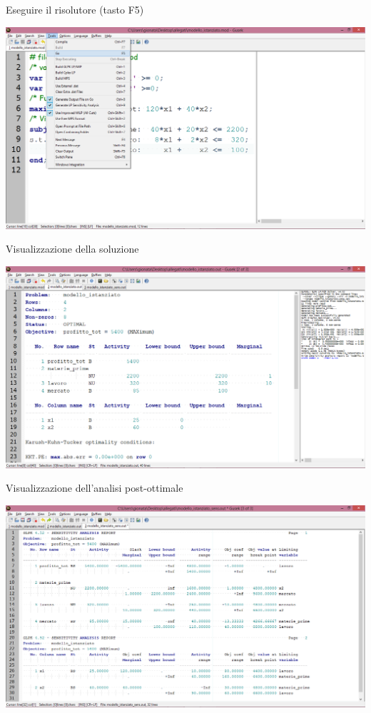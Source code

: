 \documentclass{beamer}
\begin{document}
\begin{frame}{Eseguire il risolutore (tasto F5)}
\begin{center}
\includegraphics[height=0.85\textheight]{img/gusek_2}
\par\end{center}
\end{frame}

\begin{frame}{Visualizzazione della soluzione}
\begin{center}
\includegraphics[height=0.85\textheight]{img/gusek_3}
\par\end{center}
\end{frame}

\begin{frame}{Visualizzazione dell'analisi post-ottimale}
\begin{center}
\includegraphics[height=0.85\textheight]{img/gusek_4}
\par\end{center}
\end{frame}
\end{document}

